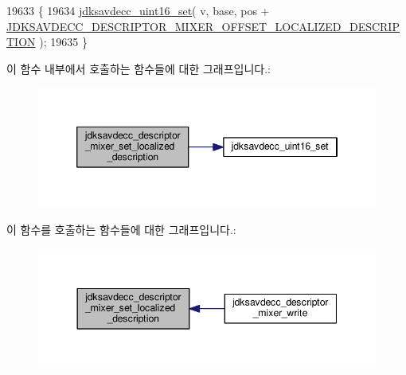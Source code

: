 \begin{DoxyCode}
19633 \{
19634     \hyperlink{group__endian_ga14b9eeadc05f94334096c127c955a60b}{jdksavdecc\_uint16\_set}( v, base, pos + 
      \hyperlink{group__descriptor__mixer_ga89dc2305d7045c0aab85cfc41bc621cd}{JDKSAVDECC\_DESCRIPTOR\_MIXER\_OFFSET\_LOCALIZED\_DESCRIPTION}
       );
19635 \}
\end{DoxyCode}


이 함수 내부에서 호출하는 함수들에 대한 그래프입니다.\+:
\nopagebreak
\begin{figure}[H]
\begin{center}
\leavevmode
\includegraphics[width=346pt]{group__descriptor__mixer_gae1361e1b7194cde00a440257c1cf6356_cgraph}
\end{center}
\end{figure}




이 함수를 호출하는 함수들에 대한 그래프입니다.\+:
\nopagebreak
\begin{figure}[H]
\begin{center}
\leavevmode
\includegraphics[width=344pt]{group__descriptor__mixer_gae1361e1b7194cde00a440257c1cf6356_icgraph}
\end{center}
\end{figure}



